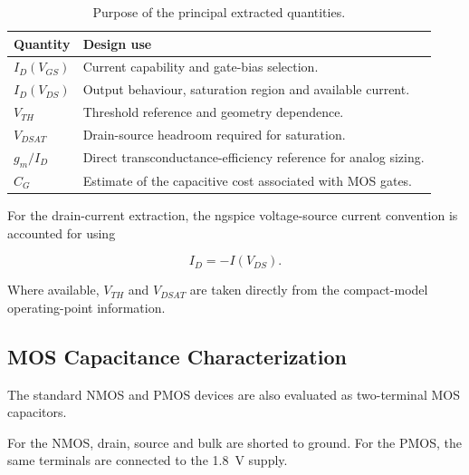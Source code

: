 \begin{table}[H]
	\centering
	\small
	\caption{Purpose of the principal extracted quantities.}
	\label{tab:quantity_purpose}
	
	\begin{tabular}{lp{}}
		\toprule
		Quantity & Design use \\
		\midrule
		
		$I_D(V_{GS})$ &
		Current capability and gate-bias selection. \\
		
		$I_D(V_{DS})$ &
		Output behaviour, saturation region and available current. \\
		
		$V_{TH}$ &
		Threshold reference and geometry dependence. \\
		
		$V_{DSAT}$ &
		Drain-source headroom required for saturation. \\
		
		$g_m/I_D$ &
		Direct transconductance-efficiency reference for analog sizing. \\
		
		$C_G$ &
		Estimate of the capacitive cost associated with MOS gates. \\
		
		\bottomrule
	\end{tabular}
\end{table}

For the drain-current extraction, the ngspice voltage-source current
convention is accounted for using

\begin{equation}
	I_D=-I(V_{DS}).
\end{equation}

Where available, $V_{TH}$ and $V_{DSAT}$ are taken directly from the
compact-model operating-point information.



\subsection{MOS Capacitance Characterization}

The standard NMOS and PMOS devices are also evaluated as two-terminal
MOS capacitors.

For the NMOS, drain, source and bulk are shorted to ground. For the
PMOS, the same terminals are connected to the
\qty{1.8}{\volt} supply.

